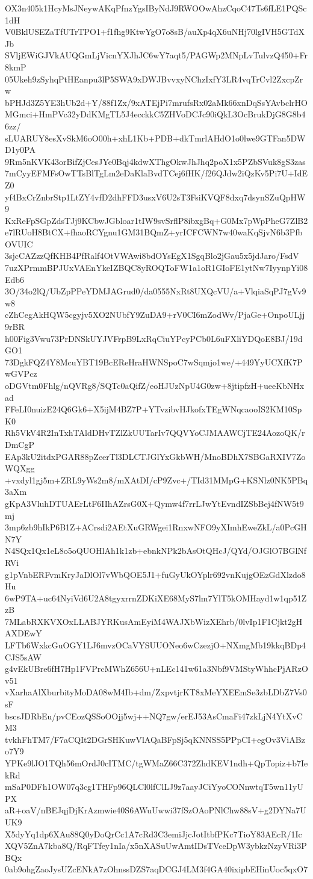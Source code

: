 OX3n405k1HcyMsJNeywAKqPfnzYgsIByNdJ9RWOOwAhzCqoC47Ts6fLE1PQSc1dH
V0BklUSEZaTfUTrTPO1+f1fhg9KtwYgO7o8sB/auXp4qX6uNHj70lgIVH5GTdXJb
SVljEWiGJVkAUQGmLjVicnYXJhJC6wY7aqt5/PAGWp2MNpLvTulvzQ450+Fr8kmP
05Ukeh9zSyhqPtHEanpu3lP5SWA9xDWJBvvxyNChzIxfY3LR4vqTrCvl2ZxcpZrw
bPHJd3Z5YE3hUb2d+Y/88f1Zx/9xATEjPi7mrufsRx02aMk66xnDqSsYAvbclrHO
MGmci+HmPVc32yDdKMgTL5J4ecckkC5ZHVoDCJc90iQkL3OcBrukDjG8G8b46zz/
sLUARUY8esXvSkM6oO00h+xhL1Kb+PDB+dkTmrlAHdO1o0lwe9GTFan5DWD1y0PA
9Rm5nKVK43orBifZjCesJYe0Bqj4kdwXThgOkwJhJhq2poX1x5PZbSVuk8gS3zas
7mCyyEFMFsOwTTsBlTgLm2eDaKlaBvdTCej6fHK/f26QJdw2iQzKv5Pi7U+IdEZ0
yf4BxCrZnbrStp1LtZY4vfD2dhFFD3usxV6U2sT3FsiKVQF8dxq7dsynSZuQpHW9
KxReFpSGpZdsTJj9KCbwJGbloar1tIW9svSrflP8ibxgBq+G0Mx7pWpPheG7ZlB2
e7lRUoH8BtCX+fhaoRCYgnu1GM31BQmZ+yrICFCWN7w40waKqSjvN6b3PfbOVUIC
3sjcCAZzzQfKHB4PfRalf4OtVWAwi8bdOYsEgX1SgqBlo2jGau5x5jdJaro/FsdV
7uzXPrmmBPJUxVAEnYkeIZBQC8yROQToFW1a1oR1GIoFE1ytNw7IyynpYi08Edb6
3O/34o2lQ/UbZpPPeYDMJAGrud0/da0555NxRt8UXQcVU/a+VlqiaSqPJ7gVv9w8
cZhCegAkHQW5cgyjv5XO2NUbfY9ZuDA9+rV0CI6mZodWv/PjaGe+OnpoULjj9rBR
h00Fig3Vwu73PrDNSkUYJVFrpB9LxRqCiuYPcyPCb0L6uFXliYDQoE8BJ/19dGO1
73DgkFQZ4Y8McuYBT19BcEReHraHWNSpoC7wSqmjo1we/+449YyUCXfK7PwGVPcz
oDGVtm0Fhlg/nQVRg8/SQTc0aQifZ/eoHJUzNpU4G0zw+8jtipfzH+ueeKbNHxad
FFeLI0nuizE24Q6Gk6+X5ijM4BZ7P+YTvzibvHJkofxTEgWNqcaooIS2KM10SpK0
Rh5VkV4R2InTxhTAldDHvTZlZkUUTarIv7QQVYoCJMAAWCjTE24AozoQK/rDmCgP
EAp3kU2itdxPGAR88pZeerTl3DLCTJGlYxGkbWH/MnoBDhX7SBGaRXIV7ZoWQXgg
+vxdyl1gj5m+ZRL9yWs2m8/mXAtDI/cP9Zvc+/TId31MMpG+KSNlz0NK5PBq3aXm
gKpA3VluhDTUAErLtF6IIhAZrsG0X+Qymw4f7rrLJwYtEvndIZSbBej4fNW5t9mj
3mp6zb9hIkP6B1Z+ACrsdi2AEtXuGRWgei1RnxwNFO9yXImhEweZkL/a0PcGHN7Y
N4SQx1Qx1eL8o5oQUOHlAh1k1zb+ebnkNPk2bAsOtQHcJ/QYd/OJGlO7BGlNfRVi
g1pVnbERFvmKryJaDlOl7vWbQOE5J1+fuGyUkOYplr692vnKujgOEzGdXlzdo8Hu
6wP9TA+uc64NyiVd6U2A8tgyxrrnZDKiXE68MyS7lm7YlT5kOMHayd1w1qp51ZzB
7MLabRXKVXOxLLABJYRKusAmEyiM4WAJXbWizXEhrb/0lvIp1F1Cjkt2gHAXDEwY
LFTb6WxkcGuOGY1LJ6mvzOCaVYSUUONeo6wCzezjO+NXmgMb19kkqBDp4CJS5sAW
g4vEkUBre6fH7Hp1FVPrcMWhZ656U+nLEc141w61a3Nbf9VMStyWhhcPjARzOv51
vXarhaAlXburbityMoDA08wM4Ib+dm/ZxpvtjrKT8xMeYXEEmSe3zbLDbZ7Vs0sF
bscsJDRbEu/pvCEozQSSoOOjj5wj++NQ7gw/erEJ53AsCmaFi47zkLjN4YtXvCM3
tvkhFhTM7/F7aCQIt2DGrSHKuwVlAQaBFpSj5qKNNSS5PPpCI+egOv3ViABzo7Y9
YPKe9lJO1TQh56mOrdJ0cITMC/tgWMaZ66C372ZhdKEV1ndh+QpTopiz+b7IekRd
mSaP0DFh1OW07q3cg1THFp96QLCl0lfClLJ9z7aayJCiYyoCONnwtqT5wn11yUPX
aR+oaV/nBEJqjDjKrAzmwie40S6AWuUwwi37fSzOAoPNlChw88sV+g2DYNa7UUK9
X5dyYq1dp6XAu88Q0yDoQrCc1A7cRd3C3emiJjcJotItbfPKc7TioY83AEcR/1Ic
XQV5ZnA7kba8Q/RqFTfey1nIa/x5nXASuUwAmtIDsTVceDpW3ybkzNzyVRi3PBQx
0ab9ohgZaoJysUZcENkA7zOhnssDZS7aqDCGJ4LM3f4GA40ixipbEHinUoc5qxO7
